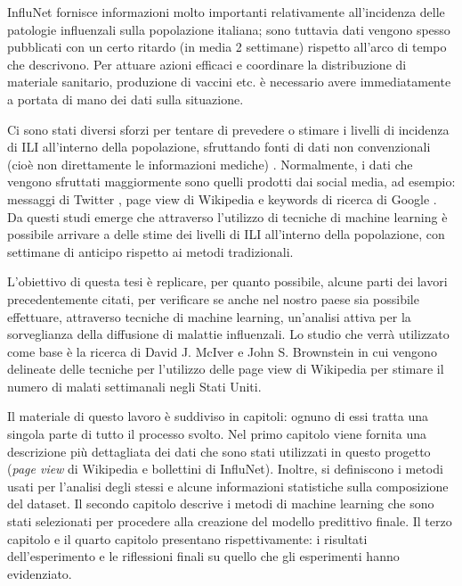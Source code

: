 InfluNet fornisce informazioni molto importanti relativamente all'incidenza delle patologie influenzali sulla popolazione
italiana; sono tuttavia dati vengono spesso pubblicati con un certo ritardo (in media 2 settimane) rispetto all'arco di tempo 
che descrivono. Per attuare azioni efficaci e coordinare la distribuzione di materiale sanitario, produzione di vaccini etc. 
è necessario avere immediatamente a portata di mano dei dati sulla situazione. 
\bigskip

Ci sono stati diversi sforzi per tentare di prevedere o stimare i livelli di incidenza di ILI all'interno della popolazione,
sfruttando fonti di dati non convenzionali (cioè non direttamente le informazioni mediche) \cite{McIver2014, Hickmann2015, 
Generous2014, googleflutrends, Signorini2011}. Normalmente, i dati che vengono sfruttati 
maggiormente sono quelli prodotti dai social media, ad esempio: messaggi di Twitter \cite{Signorini2011}, page view di 
Wikipedia \cite{McIver2014, Hickmann2015, Generous2014} e keywords di ricerca di Google \cite{googleflutrends}. Da questi 
studi emerge che attraverso l'utilizzo di tecniche di machine learning è possibile arrivare a delle stime dei livelli di ILI 
all'interno della popolazione, con settimane di anticipo rispetto ai metodi tradizionali.
\bigskip

L'obiettivo di questa tesi è replicare, per quanto possibile, alcune parti dei lavori precedentemente citati, per
verificare se anche nel nostro paese sia possibile effettuare, attraverso tecniche di machine learning, un'analisi
attiva per la sorveglianza della diffusione di malattie influenzali. Lo studio che verrà utilizzato come base 
è la ricerca di David J. McIver e John S. Brownstein \cite{McIver2014} in cui vengono delineate delle tecniche per 
l'utilizzo delle page view di Wikipedia per stimare il numero di malati settimanali negli Stati Uniti.
\bigskip

Il materiale di questo lavoro è suddiviso in capitoli: ognuno di essi tratta una singola parte di tutto il processo svolto. 
Nel primo capitolo viene fornita una descrizione più dettagliata dei dati che sono stati utilizzati in questo progetto
(\textit{page view} di Wikipedia e bollettini di InfluNet). Inoltre, si definiscono i metodi usati per l'analisi degli 
stessi e alcune informazioni statistiche sulla composizione del dataset.
Il secondo capitolo descrive i metodi di machine learning che sono stati selezionati per procedere alla creazione
del modello predittivo finale.
Il terzo capitolo e il quarto capitolo presentano rispettivamente: i risultati dell'esperimento e le riflessioni finali su 
quello che gli esperimenti hanno evidenziato.
\newpage




